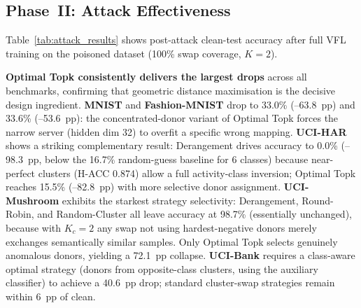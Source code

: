 \documentclass{article}
\begin{document}
\subsection{Phase~II: Attack Effectiveness}
Table~\ref{tab:attack_results} shows post-attack clean-test accuracy after
full VFL training on the poisoned dataset (100\% swap coverage, $K\!=\!2$).

\textbf{Optimal Topk consistently delivers the largest drops} across all
benchmarks, confirming that geometric distance maximisation is the
decisive design ingredient.
\textbf{MNIST} and \textbf{Fashion-MNIST} drop to 33.0\% (--63.8~pp) and
33.6\% (--53.6~pp): the concentrated-donor variant of Optimal Topk forces
the narrow server (hidden dim 32) to overfit a specific wrong mapping.
\textbf{UCI-HAR} shows a striking complementary result: Derangement drives
accuracy to 0.0\% (--98.3~pp, below the 16.7\% random-guess baseline for
6 classes) because near-perfect clusters (H-ACC 0.874) allow a full
activity-class inversion; Optimal Topk reaches 15.5\% (--82.8~pp) with
more selective donor assignment.
\textbf{UCI-Mushroom} exhibits the starkest strategy selectivity: Derangement,
Round-Robin, and Random-Cluster all leave accuracy at 98.7\% (essentially
unchanged), because with $K_c\!=\!2$ any swap not using hardest-negative
donors merely exchanges semantically similar samples.
Only Optimal Topk selects genuinely anomalous donors, yielding a 72.1~pp
collapse.
\textbf{UCI-Bank} requires a class-aware optimal strategy (donors from
opposite-class clusters, using the auxiliary classifier) to achieve a
40.6~pp drop; standard cluster-swap strategies remain within 6~pp of clean.
\end{document}
